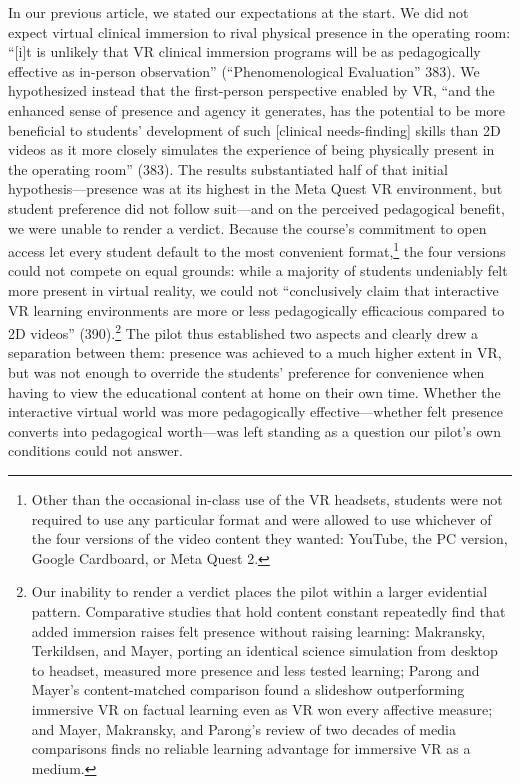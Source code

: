 In our previous article, we stated our expectations at the start. We did not
expect virtual clinical immersion to rival physical presence in the operating
room: ``[i]t is unlikely that VR clinical immersion programs will be as
pedagogically effective as in-person observation'' (``Phenomenological
Evaluation'' 383). We hypothesized instead that the first-person perspective
enabled by VR, ``and the enhanced sense of presence and agency it generates, has
the potential to be more beneficial to students' development of such [clinical
needs-finding] skills than 2D videos as it more closely simulates the experience
of being physically present in the operating room'' (383). The results
substantiated half of that initial hypothesis---presence was at its highest in
the Meta Quest VR environment, but student preference did not follow suit---and
on the perceived pedagogical benefit, we were unable to render a verdict.
Because the course's commitment to open access let every student default to the
most convenient format,\footnote{Other than the occasional in-class use of the
VR headsets, students were not required to use any particular format and were
allowed to use whichever of the four versions of the video content they wanted:
YouTube, the PC version, Google Cardboard, or Meta Quest 2.} the four versions
could not compete on equal grounds: while a majority of students undeniably felt
more present in virtual reality, we could not ``conclusively claim that
interactive VR learning environments are more or less pedagogically efficacious
compared to 2D videos'' (390).\footnote{Our inability to render a verdict places
the pilot within a larger evidential pattern. Comparative studies that hold
content constant repeatedly find that added immersion raises felt presence
without raising learning: Makransky, Terkildsen, and Mayer, porting an identical
science simulation from desktop to headset, measured more presence and less
tested learning; Parong and Mayer's content-matched comparison found a slideshow
outperforming immersive VR on factual learning even as VR won every affective
measure; and Mayer, Makransky, and Parong's review of two decades of media
comparisons finds no reliable learning advantage for immersive VR as a medium.}
The pilot thus established two aspects and clearly drew a separation between
them: presence was achieved to a much higher extent in VR, but was not enough to
override the students' preference for convenience when having to view the
educational content at home on their own time. Whether the interactive virtual
world was more pedagogically effective---whether felt presence converts into
pedagogical worth---was left standing as a question our pilot's own conditions
could not answer.

